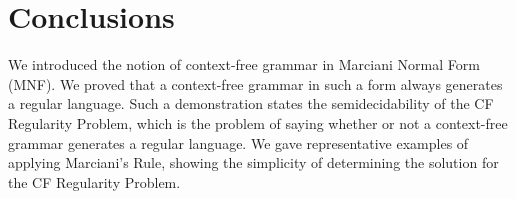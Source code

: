\section{Conclusions}
\label{sec:conclusions}

We introduced the notion of context-free grammar in Marciani Normal Form (MNF).
We proved that a context-free grammar in such a form always generates a regular
language.
Such a demonstration states the semidecidability of the CF Regularity Problem,
which is the problem of saying whether or not a context-free grammar generates a
regular language.
We gave representative examples of applying Marciani's Rule, showing the
simplicity of determining the solution for the CF Regularity Problem.
